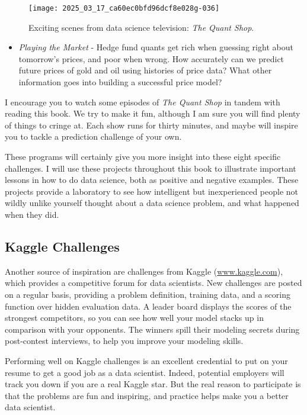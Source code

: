 \documentclass[10pt]{article}
\begin{document}
\begin{figure}
    \centering
    \texttt{[image: 2025\_03\_17\_ca60ec0bfd96dcf8e028g-036]}
    \caption{Exciting scenes from data science television: \textit{The Quant Shop}.}
    \label{fig:quant_shop}
\end{figure}

\begin{itemize}
    \item \textit{Playing the Market} - Hedge fund quants get rich when guessing right about tomorrow's prices, and poor when wrong. How accurately can we predict future prices of gold and oil using histories of price data? What other information goes into building a successful price model?
\end{itemize}

I encourage you to watch some episodes of \textit{The Quant Shop} in tandem with reading this book. We try to make it fun, although I am sure you will find plenty of things to cringe at. Each show runs for thirty minutes, and maybe will inspire you to tackle a prediction challenge of your own.

These programs will certainly give you more insight into these eight specific challenges. I will use these projects throughout this book to illustrate important lessons in how to do data science, both as positive and negative examples. These projects provide a laboratory to see how intelligent but inexperienced people not wildly unlike yourself thought about a data science problem, and what happened when they did.

\subsection{Kaggle Challenges}
Another source of inspiration are challenges from Kaggle (\href{http://www.kaggle.com}{www.kaggle.com}), which provides a competitive forum for data scientists. New challenges are posted on a regular basis, providing a problem definition, training data, and a scoring function over hidden evaluation data. A leader board displays the scores of the strongest competitors, so you can see how well your model stacks up in comparison with your opponents. The winners spill their modeling secrets during post-contest interviews, to help you improve your modeling skills.

Performing well on Kaggle challenges is an excellent credential to put on your resume to get a good job as a data scientist. Indeed, potential employers will track you down if you are a real Kaggle star. But the real reason to participate is that the problems are fun and inspiring, and practice helps make you a better data scientist.
\end{document}
